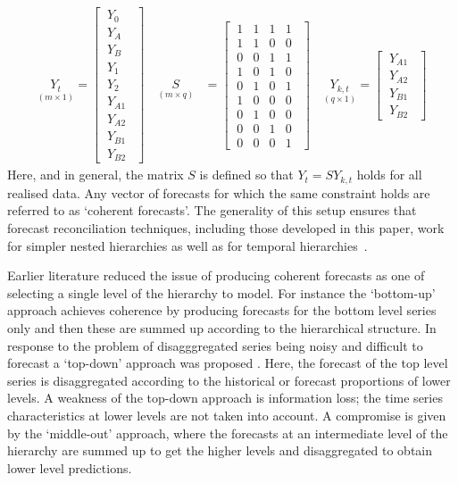 \documentclass[a4paper,fleqn,11pt]{article}
\begin{document}
\begin{align*}
\underset{(m\times 1)}{Y_t} = \begin{bmatrix}
\ Y_0\ \ \\
\ Y_A\ \ \\
\ Y_B\ \ \\
\ Y_1\ \ \\
\ Y_2\ \ \\
\ Y_{A1}\ \ \\
\ Y_{A2}\ \ \\
\ Y_{B1}\ \ \\
\ Y_{B2}\ \ 
\end{bmatrix} \quad \underset{(m\times q)}{S} &=
\begin{bmatrix}
\ 1 & 1 & 1 & 1 \ \ \\
\ 1 & 1 & 0 & 0 \ \ \\
\ 0 & 0  & 1 & 1\ \ \\
\ 1 & 0 & 1 & 0 \ \ \\
\ 0 & 1 & 0 & 1\ \ \\
\ 1 & 0 & 0 & 0 \ \ \\
\ 0 & 1 & 0 & 0 \ \ \\
\ 0 & 0 & 1 & 0 \ \ \\
\ 0 & 0 & 0 & 1\ \ 
\end{bmatrix} \quad \underset{(q\times 1)}{Y_{k,t}} = \begin{bmatrix}
	\ Y_{A1}\ \ \\
	\ Y_{A2}\ \ \\
	\ Y_{B1}\ \ \\
	\ Y_{B2}\ \ 
\end{bmatrix} 
\end{align*}
Here, and in general, the matrix $S$ is defined so that $Y_t = S Y_{k,t}$ holds for all realised data.  Any vector of forecasts for which the same constraint holds are referred to as `coherent forecasts'.  The generality of this setup ensures that forecast reconciliation techniques, including those developed in this paper, work for simpler nested hierarchies as well as for temporal hierarchies~\cite{Athanasopoulos2017}.

Earlier literature reduced the issue of producing coherent forecasts as one of selecting a single level of the hierarchy to model.  For instance the `bottom-up' approach \cite{Gross1990} achieves coherence by producing forecasts for the bottom level series only and then these are summed up according to the hierarchical structure. In response to the problem of disagggregated series being noisy and difficult to forecast a `top-down' approach was proposed \citep[see][and references therein]{Athanasopoulos2009}.  Here, the forecast of the top level series is disaggregated according to the historical or forecast proportions of lower levels. A weakness of the top-down approach is information loss; the time series characteristics at lower levels are not taken into account. A compromise is given by the `middle-out' approach, where the forecasts at an intermediate level of the hierarchy are summed up to get the higher levels and disaggregated to obtain lower level predictions.
\end{document}
